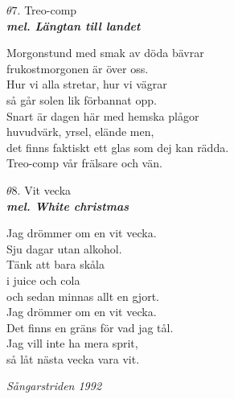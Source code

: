 \documentclass[a6paper,10pt]{article}
\newcommand{\mel}[1]{\small\textbf{\textit{mel. #1 \\}}}
\begin{document}
\setlength{\oddsidemargin}{-0.37in}
\begin{center}
\Large $\theta7$. Treo-comp\\ 
\mel{Längtan till landet}
\end{center}
Morgonstund med smak av döda bävrar\\
frukostmorgonen är över oss.\\
Hur vi alla stretar, hur vi vägrar\\
så går solen lik förbannat opp.
\vspace{5pt}\\
Snart är dagen här med hemska plågor\\
huvudvärk, yrsel, elände men,\\
det finns faktiskt ett glas som dej kan rädda.\\
Treo-comp vår frälsare och vän. 
\vspace{40pt}
\begin{center}
\Large $\theta8$. Vit vecka\\ 
\mel{White christmas}
\end{center}
Jag drömmer om en vit vecka.\\
Sju dagar utan alkohol.\\
Tänk att bara skåla\\
i juice och cola\\
och sedan minnas allt en gjort.
\vspace{5pt}\\
Jag drömmer om en vit vecka.\\
Det finns en gräns för vad jag tål.\\
Jag vill inte ha mera sprit,\\
så låt nästa vecka vara vit.
\begin{flushright}
\textit{Sångarstriden 1992}
\end{flushright} 
\end{document}
